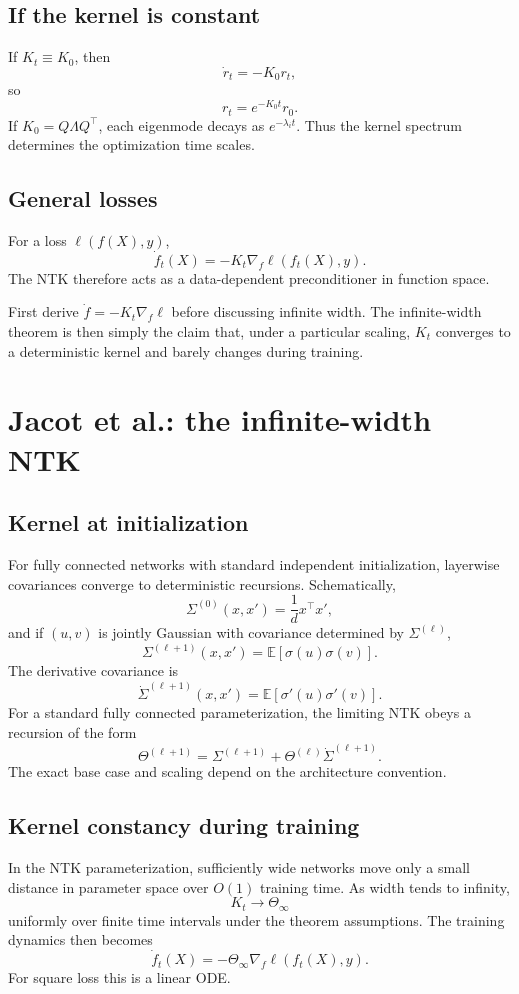 \documentclass[11pt,a4paper,oneside,openany]{memoir}
\newcommand{\E}{\mathbb{E}}
\theoremstyle{definition}
\begin{document}
\section{If the kernel is constant}
If $K_t\equiv K_0$, then
\[
\dot r_t=-K_0r_t,
\]
so
\[
\boxed{r_t=e^{-K_0t}r_0.}
\]
If $K_0=Q\Lambda Q^\top$, each eigenmode decays as $e^{-\lambda_i t}$.  Thus the kernel spectrum determines the optimization time scales.

\section{General losses}
For a loss $\ell(f(X),y)$,
\[
\dot f_t(X)=-K_t\nabla_f\ell(f_t(X),y).
\]
The NTK therefore acts as a data-dependent preconditioner in function space.

\begin{presentbox}
First derive $\dot f=-K_t\nabla_f\ell$ before discussing infinite width.  The infinite-width theorem is then simply the claim that, under a particular scaling, $K_t$ converges to a deterministic kernel and barely changes during training.
\end{presentbox}

\chapter{Jacot et al.: the infinite-width NTK}
\section{Kernel at initialization}
For fully connected networks with standard independent initialization, layerwise covariances converge to deterministic recursions.  Schematically,
\[
\Sigma^{(0)}(x,x')=\frac1d x^\top x',
\]
and if $(u,v)$ is jointly Gaussian with covariance determined by $\Sigma^{(\ell)}$,
\[
\Sigma^{(\ell+1)}(x,x')
=\E[\sigma(u)\sigma(v)].
\]
The derivative covariance is
\[
\dot\Sigma^{(\ell+1)}(x,x')
=\E[\sigma'(u)\sigma'(v)].
\]
For a standard fully connected parameterization, the limiting NTK obeys a recursion of the form
\[
\Theta^{(\ell+1)}
=\Sigma^{(\ell+1)}+\Theta^{(\ell)}\dot\Sigma^{(\ell+1)}.
\]
The exact base case and scaling depend on the architecture convention.

\section{Kernel constancy during training}
In the NTK parameterization, sufficiently wide networks move only a small distance in parameter space over $O(1)$ training time.  As width tends to infinity,
\[
K_t\longrightarrow \Theta_\infty
\]
uniformly over finite time intervals under the theorem assumptions.  The training dynamics then becomes
\[
\dot f_t(X)=-\Theta_\infty\nabla_f\ell(f_t(X),y).
\]
For square loss this is a linear ODE.
\end{document}
